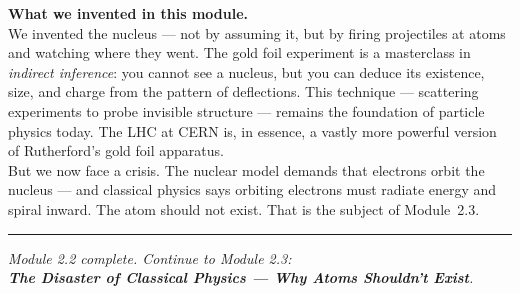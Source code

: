 \documentclass[12pt, a4paper]{book}
\theoremstyle{definition}
\begin{document}
\vspace{1.5em}
\begin{center}
\begin{tcolorbox}[
  enhanced, colback=DiscoveryColor!8, colframe=DiscoveryColor,
  width=0.88\textwidth, arc=3pt
]
\centering\sffamily\small
\textbf{What we invented in this module.}\\[4pt]
We invented the nucleus --- not by assuming it, but by firing
projectiles at atoms and watching where they went.
The gold foil experiment is a masterclass in
\emph{indirect inference}: you cannot see a nucleus,
but you can deduce its existence, size, and charge
from the pattern of deflections.
This technique --- scattering experiments to probe
invisible structure --- remains the foundation of
particle physics today.
The LHC at CERN is, in essence, a vastly more powerful
version of Rutherford's gold foil apparatus.\\[4pt]
But we now face a crisis.
The nuclear model demands that electrons orbit the nucleus ---
and classical physics says orbiting electrons must radiate
energy and spiral inward.
The atom should not exist.
That is the subject of Module~2.3.
\end{tcolorbox}
\end{center}

\vspace{2em}
\noindent\textcolor{JourneyColor!40}{\rule{\textwidth}{0.6pt}}
\begin{center}
\textit{\sffamily\small
Module 2.2 complete. Continue to Module 2.3:\\
\textbf{The Disaster of Classical Physics --- Why Atoms Shouldn't Exist}.}
\end{center}
\end{document}
